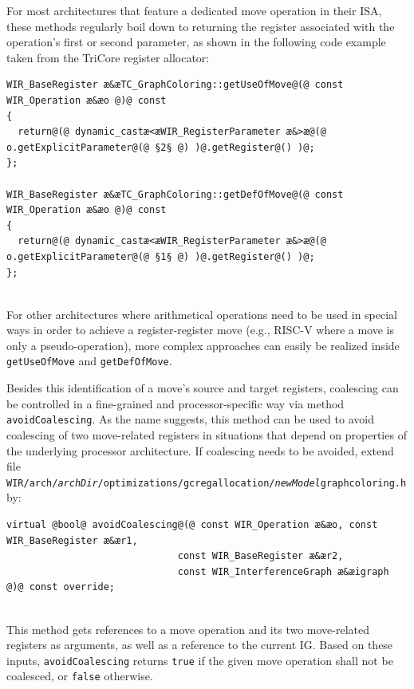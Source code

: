 For most architectures that feature a dedicated move operation in their \gls{ISA}, these methods regularly boil down to returning the register associated with the operation's first or second parameter, as shown in the following code example taken from the TriCore register allocator: \\
\begin{lstlisting}[style=code,float=!ht,aboveskip=-0.8 \baselineskip,belowskip=-0.8 \baselineskip]
WIR_BaseRegister æ&æTC_GraphColoring::getUseOfMove@(@ const WIR_Operation æ&æo @)@ const
{
  return@(@ dynamic_castæ<æWIR_RegisterParameter æ&>æ@(@ o.getExplicitParameter@(@ §2§ @) )@.getRegister@() )@;
};

WIR_BaseRegister æ&æTC_GraphColoring::getDefOfMove@(@ const WIR_Operation æ&æo @)@ const
{
  return@(@ dynamic_castæ<æWIR_RegisterParameter æ&>æ@(@ o.getExplicitParameter@(@ §1§ @) )@.getRegister@() )@;
};
\end{lstlisting}
\\
For other architectures where arithmetical operations need to be used in special ways in order to achieve a register-register move (e.g., RISC-V where a move is only a pseudo-operation), more complex approaches can easily be realized inside \texttt{getUseOfMove} and \texttt{getDefOfMove}.

Besides this identification of a move's source and target registers, coalescing can be controlled in a fine-grained and processor-specific way via method \texttt{avoidCoalescing}.
As the name suggests, this method can be used to avoid coalescing of two move-related registers in situations that depend on properties of the underlying processor architecture.
If coalescing needs to be avoided, extend file \texttt{WIR/arch/{\itshape archDir}/optimizations/gc\-reg\-allo\-cation/{\itshape newModel}\-graphcoloring.h} by: \\
\begin{lstlisting}[style=code,float=!ht,aboveskip=-0.8 \baselineskip,belowskip=-0.8 \baselineskip]
virtual @bool@ avoidCoalescing@(@ const WIR_Operation æ&æo, const WIR_BaseRegister æ&ær1,
                              const WIR_BaseRegister æ&ær2,
                              const WIR_InterferenceGraph æ&æigraph @)@ const override;
\end{lstlisting}
\\
This method gets references to a move operation and its two move-related registers as arguments, as well as a reference to the current \gls{IG}.
Based on these inputs, \texttt{avoidCoalescing} returns \texttt{true} if the given move operation shall not be coalesced, or \texttt{false} otherwise.

